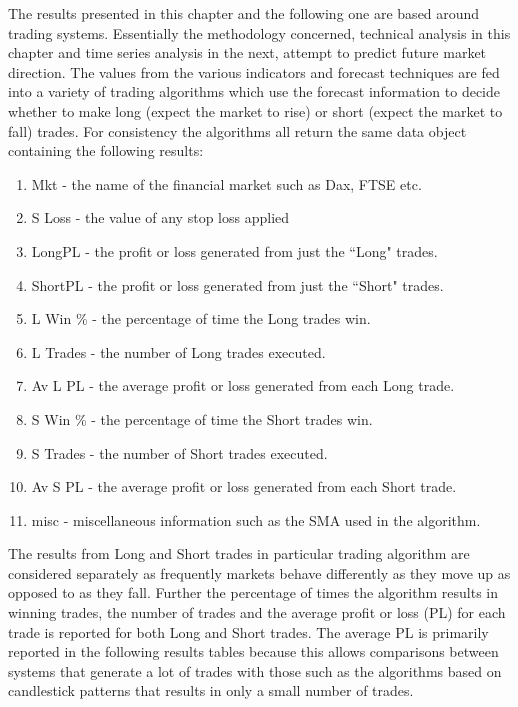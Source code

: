 The results presented in this chapter and the following one are based around trading systems. Essentially the methodology concerned, technical analysis in this chapter and time series analysis in the next, attempt to predict future market direction. The values from the various indicators and forecast techniques are fed into a variety of trading algorithms which use the forecast information to decide whether to make long (expect the market to rise) or short (expect the market to fall) trades. For consistency the algorithms all return the same data object containing the following results:

\begin{enumerate}
\item Mkt - the name of the financial market such as Dax, FTSE etc.
\item S Loss - the value of any stop loss applied
\item LongPL - the profit or loss generated from just the \textquotedblleft Long" trades.
\item ShortPL - the profit or loss generated from just the \textquotedblleft Short" trades.
\item L Win \% - the percentage of time the Long trades win.
\item L Trades - the number of Long trades executed.
\item Av L PL - the average profit or loss generated from each Long trade.
\item S Win \% - the percentage of time the Short trades win.
\item S Trades - the number of Short trades executed.
\item Av S PL - the average profit or loss generated from each Short trade.
\item misc - miscellaneous information such as the SMA used in the algorithm.
\end{enumerate}

The results from Long and Short trades in particular trading algorithm are considered separately as frequently markets behave differently as they move up as opposed to as they fall. Further the percentage of times the algorithm results in winning trades, the number of trades and the average profit or loss (PL) for each trade is reported for both Long and Short trades. The average PL is primarily reported in the following results tables because this allows comparisons between systems that generate a lot of trades with those such as the algorithms based on candlestick patterns that results in only a small number of trades. 

